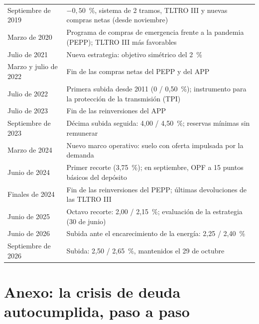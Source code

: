 \documentclass[11pt]{article}
\begin{document}
\begin{table}[H]
\begin{tabular}{>{\raggedright\arraybackslash}p{}>{\raggedright\arraybackslash}p{}}
Septiembre de 2019 & $-0{,}50$~\%, sistema de 2 tramos, TLTRO III y nuevas compras netas (desde noviembre) \\
Marzo de 2020 & Programa de compras de emergencia frente a la pandemia (PEPP); TLTRO III más favorables\nocite{BCE2026PEPP} \\
Julio de 2021 & Nueva estrategia: objetivo simétrico del 2~\%\nocite{BCE2021Estrategia} \\
Marzo y julio de 2022 & Fin de las compras netas del PEPP y del APP \\
Julio de 2022 & Primera subida desde 2011 (0 / 0,50~\%); instrumento para la protección de la transmisión (TPI)\nocite{BCE2022TPI} \\
Julio de 2023 & Fin de las reinversiones del APP \\
Septiembre de 2023 & Décima subida seguida: 4,00 / 4,50~\%; reservas mínimas sin remunerar\nocite{BCE2023Reservas} \\
Marzo de 2024 & Nuevo marco operativo: suelo con oferta impulsada por la demanda\nocite{BCE2024Marco} \\
Junio de 2024 & Primer recorte (3,75~\%); en septiembre, OPF a 15 puntos básicos del depósito \\
Finales de 2024 & Fin de las reinversiones del PEPP; últimas devoluciones de las TLTRO III \\
Junio de 2025 & Octavo recorte: 2,00 / 2,15~\%; evaluación de la estrategia (30 de junio)\nocite{BCE2025Estrategia} \\
Junio de 2026 & Subida ante el encarecimiento de la energía: 2,25 / 2,40~\% \\
Septiembre de 2026 & Subida: 2,50 / 2,65~\%, mantenidos el 29 de octubre\nocite{BCE2026Decisiones} \\
\bottomrule
\end{tabular}
\end{table}

\section{Anexo: la crisis de deuda autocumplida, paso a paso}\label{anexo:autocumplida}
\end{document}
